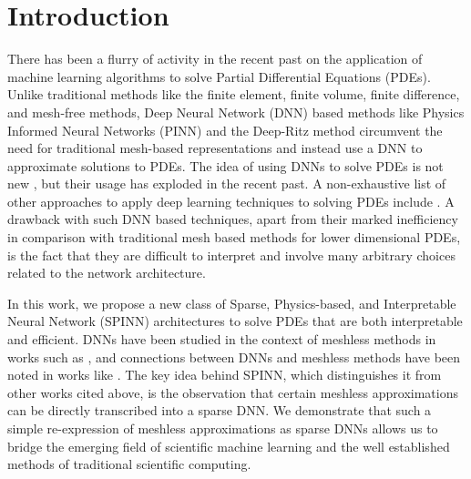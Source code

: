 \documentclass[12pt]{article}
\begin{document}
\section{Introduction}
There has been a flurry of activity in the recent past on the application of machine learning algorithms to solve Partial Differential Equations (PDEs). Unlike traditional methods like the finite element, finite volume, finite difference, and mesh-free methods, Deep Neural Network (DNN) based methods like Physics Informed Neural Networks (PINN) \cite{RPK2019} and the Deep-Ritz method \cite{EYu2018} circumvent the need for traditional mesh-based representations and instead use a DNN to approximate solutions to PDEs. The idea of using DNNs to solve PDEs is not new \cite{LLF97, LLP2000}, but their usage has exploded in the recent past. A non-exhaustive list of other approaches to apply deep learning techniques to solving PDEs include \cite{BN2018, SiKo2018, HJE2018, LLMXD2018, SAGNGHZR2020, WZ2020, LCX2020, CCLL2020, WXZZ2020pre, DS2020, lu2021deepxde, LTPGC2021}. A drawback with such DNN based techniques, apart from their marked inefficiency in comparison with traditional mesh based methods for lower dimensional PDEs, is the fact that they are difficult to interpret and involve many arbitrary choices related to the network architecture.

In this work, we propose a new class of Sparse, Physics-based, and Interpretable Neural Network (SPINN) architectures to solve PDEs that are both interpretable and efficient. DNNs have been studied in the context of meshless methods in works such as \cite{HHM2020, WZ2020}, and connections between DNNs and meshless methods have been noted in works like \cite{EMW20}. The key idea behind SPINN, which distinguishes it from other works cited above, is the observation that certain meshless approximations can be directly transcribed into a sparse DNN. We demonstrate that such a simple re-expression of meshless approximations as sparse DNNs allows us to bridge the emerging field of scientific machine learning and the well established methods of traditional scientific computing.
\end{document}
